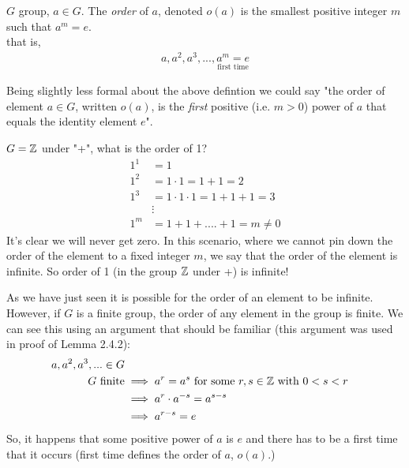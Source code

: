 \begin{definition}
$G$ group, $a\in G$. The \textit{order} of $a$, denoted $o(a)$ is the smallest positive integer $m$ such that $a^m=e$.\steezybreak\\ that is,
\begin{align}
    a,a^2,a^3, ..., \underset{\text{first time}}{a^m=e}\nonumber
\end{align}
\end{definition}
Being slightly less formal about the above defintion we could say "the order of element $a\in G$, written $o(a)$, is the \textit{first} positive (i.e. $m>0$) power of $a$ that equals the identity element $e$".
\begin{example}
$G={\mathbb{ Z}}$ under "+", what is the order of 1?
\begin{align}
    1^1&=1\nonumber\\
    1^2&=1\cdot 1= 1+1=2\nonumber\\
    1^3&=1\cdot 1\cdot 1=1+1+1=3\nonumber\\
    &\vdots \nonumber \\
    1^m&=1+1+....+1=m \neq 0\nonumber
\end{align}
It's clear we will never get zero. In this scenario, where we cannot pin down the order of the element to a fixed integer $m$, we say that the order of the element is infinite. So order of 1 (in the group ${\mathbb{ Z}}$ under +) is infinite!
\end{example}
As we have just seen it is possible for the order of an element to be infinite. However, if $G$ is a finite group, the order of any element in the group is finite. We can see this using an argument that should be familiar (this argument was used in proof of Lemma 2.4.2):
\begin{align}
    a,a^2,a^3,... \in G \nonumber\\
    G \text{ finite} &\implies a^r=a^s \text{ for some }r,s\in {\mathbb{ Z}} \text{ with }0<s<r \nonumber \\
    &\implies a^r\cdot a^{-s}=a^{s-s} \nonumber \\
    &\implies a^{r-s}=e \nonumber
\end{align}
So, it happens that some positive power of $a$ is $e$ and there has to be a first time that it occurs (first time defines the order of $a$, $o(a)$.)
